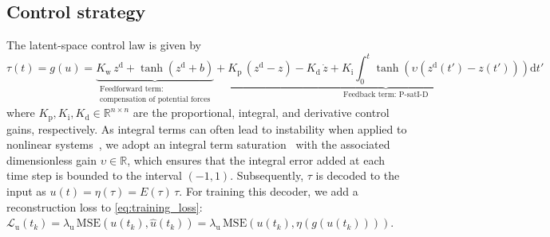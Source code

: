 \subsection{Control strategy}
The latent-space control law is given by
\begin{equation}\label{eq:con:controller}
    \tau(t) = g(u) = \underbrace{K_\mathrm{w} \, z^\mathrm{d} + \tanh(z^\mathrm{d} + b)}_{\substack{\text{Feedforward term:}\\ \text{compensation of potential forces}}} + \underbrace{K_\mathrm{p} \, (z^\mathrm{d} - z) - K_\mathrm{d} \, \dot{z} + K_\mathrm{i} \int_0^t \tanh(\upsilon (z^\mathrm{d}(t') - z(t')))\mathrm{d}t'}_{\text{Feedback term: P-satI-D}}
\end{equation}
where $K_\mathrm{p}, K_\mathrm{i}, K_\mathrm{d} \in \mathbb{R}^{n \times n}$ are the proportional, integral, and derivative control gains, respectively.
As integral terms can often lead to instability when applied to nonlinear systems~\cite{stolzle2024experimental}, we adopt an integral term saturation~\cite{pustina2022p} with the associated dimensionless gain $\upsilon \in \mathbb{R}$, which ensures that the integral error added at each time step is bounded to the interval $(-1, 1)$.
% 
Subsequently, $\tau$ is  decoded to the input as $u(t) = \eta(\tau) = E(\tau) \, \tau$.
For training this decoder, we add a reconstruction loss to \eqref{eq:training_loss}: $\mathcal{L}_{\mathrm{u}}(t_k) = \lambda_{\mathrm{u}} \, \mathrm{MSE}(u(t_k), \hat{u}(t_k)) = \lambda_{\mathrm{u}} \, \mathrm{MSE} \left (u(t_k), \eta(g(u(t_k))) \right )$.

